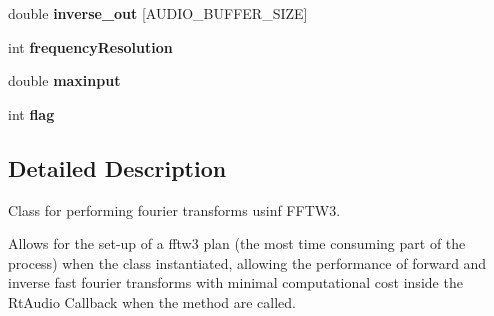 \begin{DoxyCompactItemize}
\item 
\hypertarget{classfft_a290d4177db41a835118d5e0003ec7e2f}{double {\bfseries inverse\-\_\-out} \mbox{[}A\-U\-D\-I\-O\-\_\-\-B\-U\-F\-F\-E\-R\-\_\-\-S\-I\-Z\-E\mbox{]}}\label{classfft_a290d4177db41a835118d5e0003ec7e2f}

\item 
\hypertarget{classfft_ae744c22f8e06bdd1a3fc471bcff821a4}{int {\bfseries frequency\-Resolution}}\label{classfft_ae744c22f8e06bdd1a3fc471bcff821a4}

\item 
\hypertarget{classfft_a01978c3e238491e7b8ecd75340e0ca3c}{double {\bfseries maxinput}}\label{classfft_a01978c3e238491e7b8ecd75340e0ca3c}

\item 
\hypertarget{classfft_a66afecdbae4bef314698644fc3f280de}{int {\bfseries flag}}\label{classfft_a66afecdbae4bef314698644fc3f280de}

\end{DoxyCompactItemize}


\subsection{Detailed Description}
Class for performing fourier transforms usinf F\-F\-T\-W3. 

Allows for the set-\/up of a fftw3 plan (the most time consuming part of the process) when the class instantiated, allowing the performance of forward and inverse fast fourier transforms with minimal computational cost inside the Rt\-Audio Callback when the method are called. 

